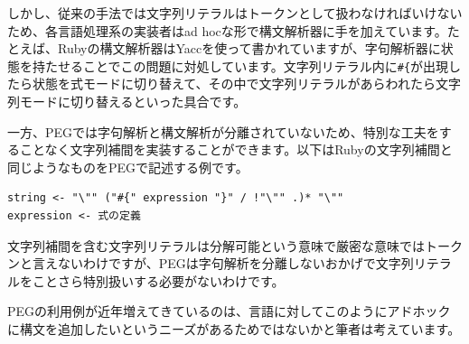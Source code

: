 \begin{Shaded}
\begin{Highlighting}[]
\OtherTok{\#\{}\OtherTok{\#\{}\OtherTok{\}}\OtherTok{\}} 
\end{Highlighting}
\end{Shaded}

しかし、従来の手法では文字列リテラルはトークンとして扱わなければいけないため、各言語処理系の実装者はad
hocな形で構文解析器に手を加えています。たとえば、Rubyの構文解析器はYaccを使って書かれていますが、字句解析器に状態を持たせることでこの問題に対処しています。文字列リテラル内に\texttt{\#\{}が出現したら状態を式モードに切り替えて、その中で文字列リテラルがあらわれたら文字列モードに切り替えるといった具合です。

一方、PEGでは字句解析と構文解析が分離されていないため、特別な工夫をすることなく文字列補間を実装することができます。以下はRubyの文字列補間と同じようなものをPEGで記述する例です。

\begin{verbatim}
string <- "\"" ("#{" expression "}" / !"\"" .)* "\""
expression <- 式の定義
\end{verbatim}

文字列補間を含む文字列リテラルは分解可能という意味で厳密な意味ではトークンと言えないわけですが、PEGは字句解析を分離しないおかげで文字列リテラルをことさら特別扱いする必要がないわけです。

PEGの利用例が近年増えてきているのは、言語に対してこのようにアドホックに構文を追加したいというニーズがあるためではないかと筆者は考えています。

